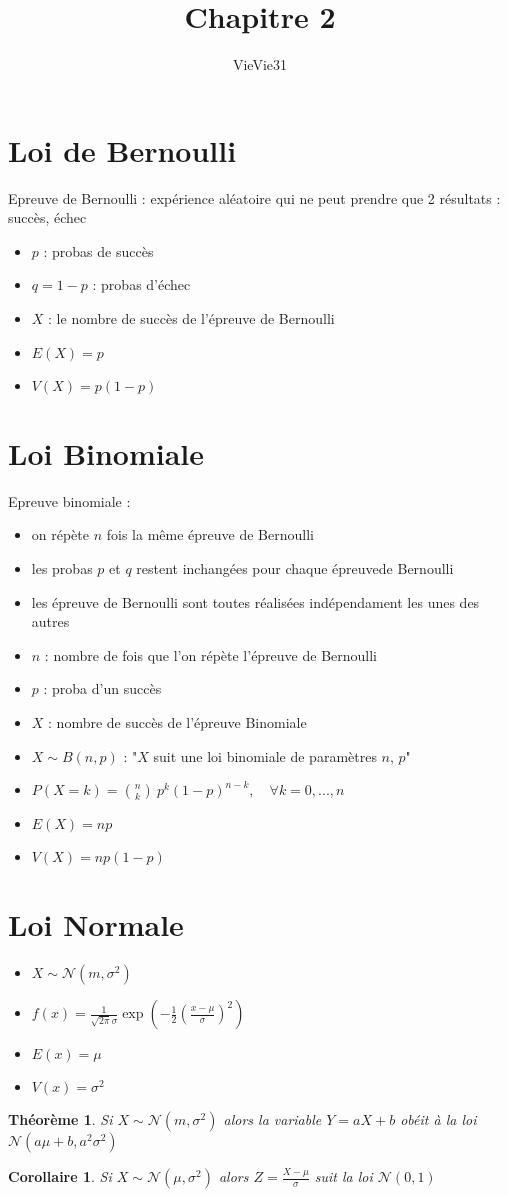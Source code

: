\documentclass{article}
\title{Chapitre 2}
\author{VieVie31}
\begin{document}
\newtheorem{theo}{Théorème}
\newtheorem{coro}{Corollaire}

\maketitle

\section{Loi de Bernoulli}
Epreuve de Bernoulli : expérience aléatoire qui ne peut prendre que 2 résultats : {succès, échec}
\begin{itemize}
    \item $p$ : probas de succès
    \item $q = 1 - p$ : probas d'échec
    \item $X$ : le nombre de succès de l'épreuve de Bernoulli
    \item $E(X) = p$
    \item $V(X) = p(1 - p)$
\end{itemize}

\section{Loi Binomiale}
Epreuve binomiale : 
\begin{itemize}
    \item on répète $n$ fois la même épreuve de Bernoulli
    \item les probas $p$ et $q$ restent inchangées pour chaque épreuvede Bernoulli
    \item les épreuve de Bernoulli sont toutes réalisées indépendament les unes des autres
    \item $n$ : nombre de fois que l'on répète l'épreuve de Bernoulli
    \item $p$ : proba d'un succès
    \item $X$ : nombre de succès de l'épreuve Binomiale
    \item $X \sim B(n, p)$ : "$X$ suit une loi binomiale de paramètres $n$, $p$"
    \item $P(X=k) = {{n}\choose{k}}\ p^k(1 - p)^{n-k}, \quad \forall k=0,...,n$
    \item $E(X) = np$
    \item $V(X) = np(1-p)$
\end{itemize}

\section{Loi Normale}
\begin{itemize}
    \item $X \sim \mathcal{N} (m,\sigma^2)$
    \item $f(x) = \frac{1}{\sqrt{2 \pi} \sigma} \exp(-\frac{1}{2}(\frac{x - \mu}{\sigma})^2)$
    \item $E(x) = \mu$
    \item $V(x) = \sigma^2$
\end{itemize}

\begin{theo}
    Si $X \sim \mathcal{N}(m, \sigma^2)$ alors la variable $Y = aX + b$ obéit à la loi $\mathcal{N}(a\mu+b, a^2\sigma^2)$
\end{theo}

\begin{coro}
    Si $X \sim \mathcal{N}(\mu, \sigma^2)$ alors $Z = \frac{X - \mu}{\sigma}$ suit la loi $\mathcal{N}(0, 1)$
\end{coro}
\end{document}

